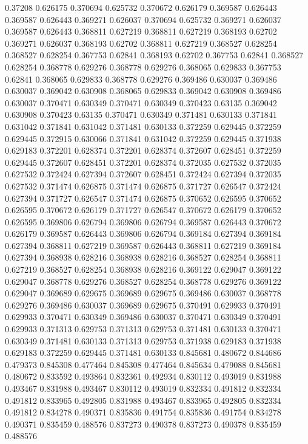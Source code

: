 0.37208 0.626175
0.370694 0.625732
0.370672 0.626179
0.369587 0.626443
0.369587 0.626443
0.369271 0.626037
0.370694 0.625732
0.369271 0.626037
0.369587 0.626443
0.368811 0.627219
0.368811 0.627219
0.368193 0.62702
0.369271 0.626037
0.368193 0.62702
0.368811 0.627219
0.368527 0.628254
0.368527 0.628254
0.367753 0.62841
0.368193 0.62702
0.367753 0.62841
0.368527 0.628254
0.368778 0.629276
0.368778 0.629276
0.368065 0.629833
0.367753 0.62841
0.368065 0.629833
0.368778 0.629276
0.369486 0.630037
0.369486 0.630037
0.369042 0.630908
0.368065 0.629833
0.369042 0.630908
0.369486 0.630037
0.370471 0.630349
0.370471 0.630349
0.370423 0.63135
0.369042 0.630908
0.370423 0.63135
0.370471 0.630349
0.371481 0.630133
0.371841 0.631042
0.371841 0.631042
0.371481 0.630133
0.372259 0.629445
0.372259 0.629445
0.372915 0.630066
0.371841 0.631042
0.372259 0.629445
0.371938 0.629183
0.372201 0.628374
0.372201 0.628374
0.372607 0.628451
0.372259 0.629445
0.372607 0.628451
0.372201 0.628374
0.372035 0.627532
0.372035 0.627532
0.372424 0.627394
0.372607 0.628451
0.372424 0.627394
0.372035 0.627532
0.371474 0.626875
0.371474 0.626875
0.371727 0.626547
0.372424 0.627394
0.371727 0.626547
0.371474 0.626875
0.370652 0.626595
0.370652 0.626595
0.370672 0.626179
0.371727 0.626547
0.370672 0.626179
0.370652 0.626595
0.369806 0.626794
0.369806 0.626794
0.369587 0.626443
0.370672 0.626179
0.369587 0.626443
0.369806 0.626794
0.369184 0.627394
0.369184 0.627394
0.368811 0.627219
0.369587 0.626443
0.368811 0.627219
0.369184 0.627394
0.368938 0.628216
0.368938 0.628216
0.368527 0.628254
0.368811 0.627219
0.368527 0.628254
0.368938 0.628216
0.369122 0.629047
0.369122 0.629047
0.368778 0.629276
0.368527 0.628254
0.368778 0.629276
0.369122 0.629047
0.369689 0.629675
0.369689 0.629675
0.369486 0.630037
0.368778 0.629276
0.369486 0.630037
0.369689 0.629675
0.370491 0.629933
0.370491 0.629933
0.370471 0.630349
0.369486 0.630037
0.370471 0.630349
0.370491 0.629933
0.371313 0.629753
0.371313 0.629753
0.371481 0.630133
0.370471 0.630349
0.371481 0.630133
0.371313 0.629753
0.371938 0.629183
0.371938 0.629183
0.372259 0.629445
0.371481 0.630133
0.845681 0.480672
0.844686 0.479373
0.845308 0.477464
0.845308 0.477464
0.845634 0.479088
0.845681 0.480672
0.833592 0.493864
0.832361 0.492934
0.830112 0.493019
0.831988 0.493467
0.831988 0.493467
0.830112 0.493019
0.832334 0.491812
0.832334 0.491812
0.833965 0.492805
0.831988 0.493467
0.833965 0.492805
0.832334 0.491812
0.834278 0.490371
0.835836 0.491754
0.835836 0.491754
0.834278 0.490371
0.835459 0.488576
0.837273 0.490378
0.837273 0.490378
0.835459 0.488576
